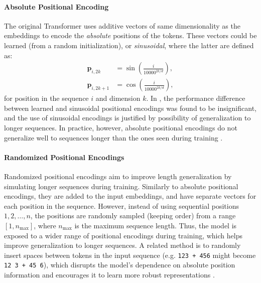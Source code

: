 \paragraph{Absolute Positional Encoding}\label{subsec:absolute_pos_enc}
The original Transformer \parencite{vaswani_attention_2017} uses additive vectors of same dimensionality as the embeddings to encode the \emph{absolute} positions of the tokens. These vectors could be learned (from a random initialization), or \emph{sinusoidal}, where the latter are defined as:
\begin{align*}
    \mathbf{p}_{i,2k}   & = \sin\left( \frac{i}{10000^{2k/d}} \right), \\
    \mathbf{p}_{i,2k+1} & = \cos\left( \frac{i}{10000^{2k/d}} \right),
\end{align*}
for position in the sequence $i$ and dimension $k$. In \cite{vaswani_attention_2017}, the performance difference between learned and sinusoidal positional encodings was found to be insignificant, and the use of sinusoidal encodings is justified by possibility of generalization to longer sequences. In practice, however, absolute positional encodings do not generalize well to sequences longer than the ones seen during training \parencite{press_train_2021}.

\paragraph{Randomized Positional Encodings}\label{subsec:random_pos_enc}
Randomized positional encodings \cite{ruoss_randomized_2023} aim to improve length generalization by simulating longer sequences during training. Similarly to absolute positional encodings, they are added to the input embeddings, and have separate vectors for each position in the sequence. However, instead of using sequential positions $1, 2, \dots, n$, the positions are randomly sampled (keeping order) from a range $[1, n_{\text{max}}]$, where $n_{\text{max}}$ is the maximum sequence length. Thus, the model is exposed to a wider range of positional encodings during training, which helps improve generalization to longer sequences. A related method is to randomly insert spaces between tokens in the input sequence (e.g. \texttt{123 + 456} might become \texttt{12 3  + 45 6}), which disrupts the model's dependence on absolute position information and encourages it to learn more robust representations \parencite{shen_positional_2023}.

